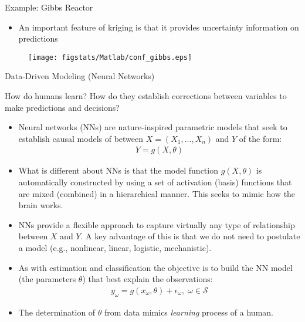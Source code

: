 \documentclass[9pt]{beamer}
\begin{document}
%
\begin{frame}{Example: Gibbs Reactor}

\begin{itemize}
\item An important feature of kriging is that it provides uncertainty information on predictions
\end{itemize}

\begin{figure}[!htb]
    \centering
	\texttt{[image: figstats/Matlab/conf\_gibbs.eps]}
\end{figure}


\end{frame}

\begin{frame}{Data-Driven Modeling (Neural Networks)}

\begin{block}{}
How do humans learn? How do they establish corrections between variables to make predictions and decisions? 
\end{block}

\begin{itemize}
\item Neural networks (NNs) are nature-inspired parametric models that seek to establish causal models of between $X=(X_1,...,X_n)$ and $Y$ of the form:
\begin{align*}
Y=g(X,\theta)
\end{align*}
\item What is different about NNs is that the model function $g(X,\theta)$ is automatically constructed by using a set of activation (basis) functions that are mixed (combined) in a hierarchical manner.  This seeks to mimic how the brain works. 

\item NNs provide a flexible approach to capture virtually any type of relationship between $X$ and $Y$. A key advantage of this is that we do not need to postulate a model (e.g., nonlinear, linear, logistic, mechanistic).  

\item As with estimation and classification the objective is to build the NN model (the parameters $\theta$) that best explain the observations:
\begin{align*}
y_\omega=g(x_\omega,\theta)+\epsilon_\omega,\; \omega \in \mathcal{S}
\end{align*}
\item The determination of $\theta$ from data mimics {\em learning} process of a human. 

\end{itemize}

\end{frame}
\end{document}
